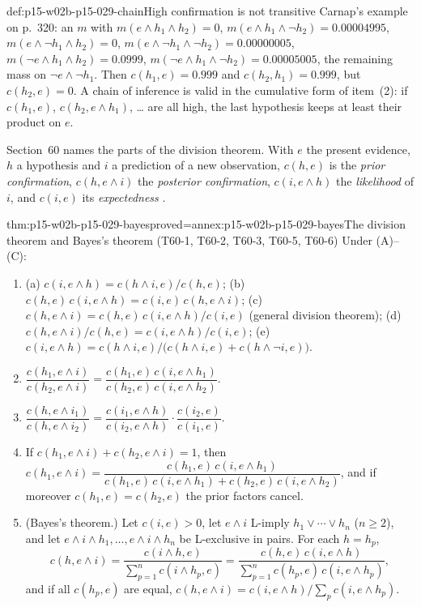 \begin{hbwarning}{def:p15-w02b-p15-029-chain}{High confirmation is not transitive}
Carnap's example on p.~320: an \(m\) with
\(m(e\land h_1\land h_2)=0\),
\(m(e\land h_1\land\neg h_2)=0.00004995\),
\(m(e\land\neg h_1\land h_2)=0\),
\(m(e\land\neg h_1\land\neg h_2)=0.00000005\),
\(m(\neg e\land h_1\land h_2)=0.0999\),
\(m(\neg e\land h_1\land\neg h_2)=0.00005005\), the remaining mass on
\(\neg e\land\neg h_1\). Then \(c(h_1,e)=0.999\) and
\(c(h_2,h_1)=0.999\), but \(c(h_2,e)=0\). A chain of inference is
valid in the cumulative form of item~(2): if
\(c(h_1,e)\), \(c(h_2,e\land h_1)\), \ldots{} are all high, the last
hypothesis keeps at least their product on \(e\).
\end{hbwarning}

Section~60 names the parts of the division theorem. With \(e\) the
present evidence, \(h\) a hypothesis and \(i\) a prediction of a new
observation, \(c(h,e)\) is the \emph{prior confirmation},
\(c(h,e\land i)\) the \emph{posterior confirmation}, \(c(i,e\land h)\)
the \emph{likelihood} of \(i\), and \(c(i,e)\) its
\emph{expectedness} \cite[sec.~60, pp.~326--327]{Carnap1950Probability}.

\begin{hbtheorem}{thm:p15-w02b-p15-029-bayes}{proved=annex:p15-w02b-p15-029-bayes}{The division theorem and Bayes's theorem (T60-1, T60-2, T60-3, T60-5, T60-6)}
Under (A)--(C):
\begin{enumerate}
 \item[T60-1.] (a) \(c(i,e\land h)=c(h\land i,e)/c(h,e)\);
       (b) \(c(h,e)\,c(i,e\land h)=c(i,e)\,c(h,e\land i)\);
       (c) \(c(h,e\land i)=c(h,e)\,c(i,e\land h)/c(i,e)\)
       (general division theorem);
       (d) \(c(h,e\land i)/c(h,e)=c(i,e\land h)/c(i,e)\);
       (e) \(c(i,e\land h)=c(h\land i,e)/\bigl(c(h\land i,e)+c(h\land\neg i,e)\bigr)\).
 \item[T60-2.] \(\dfrac{c(h_1,e\land i)}{c(h_2,e\land i)}
       =\dfrac{c(h_1,e)\,c(i,e\land h_1)}{c(h_2,e)\,c(i,e\land h_2)}\).
 \item[T60-3.] \(\dfrac{c(h,e\land i_1)}{c(h,e\land i_2)}
       =\dfrac{c(i_1,e\land h)}{c(i_2,e\land h)}\cdot\dfrac{c(i_2,e)}{c(i_1,e)}\).
 \item[T60-5.] If \(c(h_1,e\land i)+c(h_2,e\land i)=1\), then
       \(c(h_1,e\land i)=\dfrac{c(h_1,e)\,c(i,e\land h_1)}
       {c(h_1,e)\,c(i,e\land h_1)+c(h_2,e)\,c(i,e\land h_2)}\), and if
       moreover \(c(h_1,e)=c(h_2,e)\) the prior factors cancel.
 \item[T60-6.] (Bayes's theorem.) Let \(c(i,e)>0\), let \(e\land i\)
       L-imply \(h_1\lor\cdots\lor h_n\) (\(n\geq2\)), and let
       \(e\land i\land h_1,\ldots,e\land i\land h_n\) be L-exclusive in
       pairs. For each \(h=h_p\),
       \[
        c(h,e\land i)=\frac{c(i\land h,e)}{\sum_{p=1}^nc(i\land h_p,e)}
        =\frac{c(h,e)\,c(i,e\land h)}{\sum_{p=1}^nc(h_p,e)\,c(i,e\land h_p)},
       \]
       and if all \(c(h_p,e)\) are equal,
       \(c(h,e\land i)=c(i,e\land h)/\sum_pc(i,e\land h_p)\).
\end{enumerate}
\end{hbtheorem}

